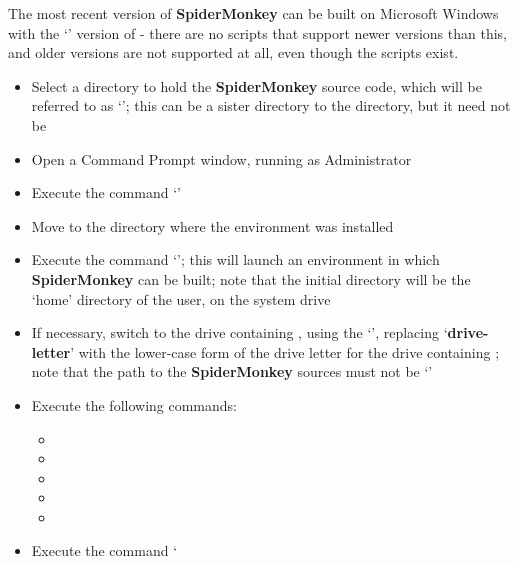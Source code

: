 \tertiaryEnd
{}
The most recent version of \textbf{SpiderMonkey} can be built on Microsoft Windows with
the `' version of  - there are
no scripts that support newer versions than this, and older versions are not supported at
all, even though the scripts exist.
\begin{itemize}
\item Select a directory to hold the \textbf{SpiderMonkey} source code, which will be
referred to as `'; this can be a sister directory to the
 directory, but it need not be
\item\exSp{}Open a Command Prompt window, running as Administrator
\item\exSp{}Execute the command
`'
\item\exSp{}Move to the directory where the  environment was
installed
\item\exSp{}Execute the command `'; this will launch
an environment in which \textbf{SpiderMonkey} can be built; note that the initial
directory will be the `home' directory of the user, on the system drive
\item\exSp{}If necessary, switch to the drive containing ,
using the `', replacing `\textbf{drive-letter}' with
the lower-case form of the drive letter for the drive containing
; note that the path to the \textbf{SpiderMonkey} sources
must not be `'
\item\exSp{}Execute the following commands:
\begin{itemize}
\item{}
\item\exSp{}
\item\exSp{}
\item\exSp{}
\item\exSp{}
\end{itemize}
\item\exSp{}Execute the command `
\end{itemize}
